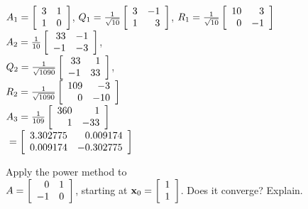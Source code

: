 \begin{multicols}{2}
\begin{ex}
\begin{sol}
\begin{enumerate}[label={\alph*.}]
$A_{1} = \left[ \begin{array}{rr}
3 & 1 \\
1 & 0
\end{array}\right]$, $Q_{1} = \tfrac{1}{\sqrt{10}}\left[ \begin{array}{rr}
3 & -1 \\
1 & 3
\end{array}\right]$, $R_{1} = \tfrac{1}{\sqrt{10}}\left[ \begin{array}{rr}
10 & 3 \\
0 & -1
\end{array}\right]$ \\
$A_{2} = \tfrac{1}{10}\left[ \begin{array}{rr}
33 & -1 \\
-1 & -3
\end{array}\right]$, \\ $Q_{2} = \tfrac{1}{\sqrt{1090}}\left[ \begin{array}{rr}
33 & 1 \\
-1 & 33
\end{array}\right]$, \\ $R_{2} = \tfrac{1}{\sqrt{1090}}\left[ \begin{array}{rr}
109 & -3 \\
0 & -10
\end{array}\right]$ \\
$A_{3} = \tfrac{1}{109}\left[ \begin{array}{rr}
360 & 1 \\
1 & -33
\end{array}\right]$ \\ ${} = \left[ \begin{array}{rr}
3.302775 & 0.009174 \\
0.009174 & -0.302775
\end{array}\right]$

\end{enumerate}
\end{sol}
\end{ex}

\begin{ex}
Apply the power method to \\ $A = \left[ \begin{array}{rr}
0 & 1 \\
-1 & 0
\end{array}\right]$, starting at $\textbf{x}_{0} = \left[ \begin{array}{rr}
1 \\
1 
\end{array}\right]$. Does it converge? Explain.
\end{ex}


\end{multicols}
